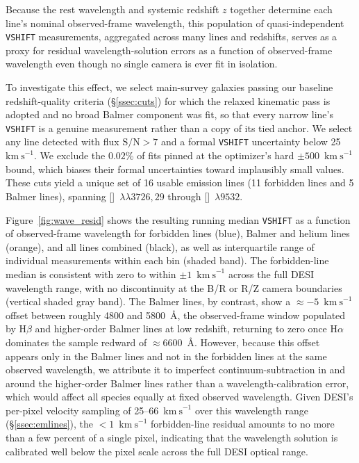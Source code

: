 \documentclass[modern,linenumbers]{aastex702}
\newcommand{\kms}{\ensuremath{\mathrm{km~s}^{-1}}}
\newcommand{\siii}{[\ion{S}{3}]}
\newcommand{\ha}{\ensuremath{\mathrm{H}\alpha}}
\newcommand{\hb}{\ensuremath{\mathrm{H}\beta}}
\newcommand{\oiidoublet}{[\ion{O}{2}]~$\lambda\lambda3726,29$}
\begin{document}
Because the rest wavelength and systemic redshift $z$ together
determine each line's nominal observed-frame wavelength, this
population of quasi-independent \texttt{VSHIFT} measurements,
aggregated across many lines and redshifts, serves as a proxy for
residual wavelength-solution errors as a function of observed-frame
wavelength even though no single camera is ever fit in isolation.

To investigate this effect, we select main-survey galaxies passing our
baseline redshift-quality criteria (\S\ref{ssec:cuts}) for which the
relaxed kinematic pass is adopted and no broad Balmer component was
fit, so that every narrow line's \texttt{VSHIFT} is a genuine
measurement rather than a copy of its tied anchor. We select any line
detected with flux $\mathrm{S/N}>7$ and a formal \texttt{VSHIFT}
uncertainty below 25~\kms. We exclude the $0.02$\% of fits pinned at
the optimizer's hard $\pm500$~\kms{} bound, which biases their formal
uncertainties toward implausibly small values. These cuts yield a
unique set of 16 usable emission lines (11 forbidden lines and 5
Balmer lines), spanning \oiidoublet{} through \siii~$\lambda9532$.

Figure~\ref{fig:wave_resid} shows the resulting running median
\texttt{VSHIFT} as a function of observed-frame wavelength for
forbidden lines (blue), Balmer and helium lines (orange), and all
lines combined (black), as well as interquartile range of individual
measurements within each bin (shaded band). The forbidden-line median
is consistent with zero to within $\pm1$~\kms{} across the full DESI
wavelength range, with no discontinuity at the B/R or R/Z camera
boundaries (vertical shaded gray band). The Balmer lines, by contrast,
show a $\approx-5$~\kms{} offset between roughly 4800 and 5800~\AA,
the observed-frame window populated by \hb{} and higher-order Balmer
lines at low redshift, returning to zero once \ha{} dominates the
sample redward of $\approx6600$~\AA. However, because this offset
appears only in the Balmer lines and not in the forbidden lines at the
same observed wavelength, we attribute it to imperfect
continuum-subtraction in and around the higher-order Balmer lines
rather than a wavelength-calibration error, which would affect all
species equally at fixed observed wavelength. Given DESI's per-pixel
velocity sampling of 25--66~\kms{} over this wavelength range
(\S\ref{ssec:emlines}), the $<1$~\kms{} forbidden-line residual
amounts to no more than a few percent of a single pixel, indicating
that the wavelength solution is calibrated well below the pixel scale
across the full DESI optical range.
\end{document}
